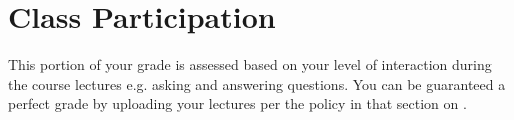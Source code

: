 \section*{Class Participation}

This portion of your grade is assessed based on your level of interaction during the course lectures e.g. asking and answering questions. You can be guaranteed a perfect grade by uploading your lectures per the policy in that section on \pageref{subsec:lecture_upload}.